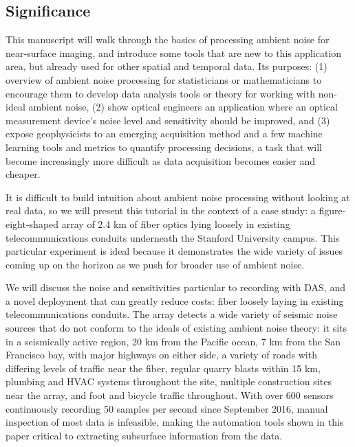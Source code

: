\documentclass[11pt]{article}
\begin{document}
\subsection*{Significance} 
\vspace{-0.2cm}
This manuscript will walk through the basics of processing ambient noise for near-surface imaging, and introduce some tools that are new to this application area, but already used for other spatial and temporal data. Its purposes: (1) overview of ambient noise processing for statisticians or mathematicians to encourage them to develop data analysis tools or theory for working with non-ideal ambient noise, (2) show optical engineers an application where an optical measurement device's noise level and sensitivity should be improved, and (3) expose geophysicists to an emerging acquisition method and a few machine learning tools and metrics to quantify processing decisions, a task that will become increasingly more difficult as data acquisition becomes easier and cheaper.
\par 
It is difficult to build intuition about ambient noise processing without looking at real data, so we will present this tutorial in the context of a case study: a figure-eight-shaped array of 2.4 km of fiber optics lying loosely in existing telecommunications conduits underneath the Stanford University campus. This particular experiment is ideal because it demonstrates the wide variety of issues coming up on the horizon as we push for broader use of ambient noise. 
\par
We will discuss the noise and sensitivities particular to recording with DAS, and a novel deployment that can greatly reduce costs: fiber loosely laying in existing telecommunications conduits. The array detects a wide variety of seismic noise sources that do not conform to the ideals of existing ambient noise theory: it sits in a seismically active region, 20 km from the Pacific ocean, 7 km from the San Francisco bay, with major highways on either side, a variety of roads with differing levels of traffic near the fiber, regular quarry blasts within 15 km, plumbing and HVAC systems throughout the site, multiple construction sites near the array, and foot and bicycle traffic throughout. With over 600 sensors continuously recording 50 samples per second since September 2016, manual inspection of most data is infeasible, making the automation tools shown in this paper critical to extracting subsurface information from the data.

\vspace{-0.5cm}
\end{document}
